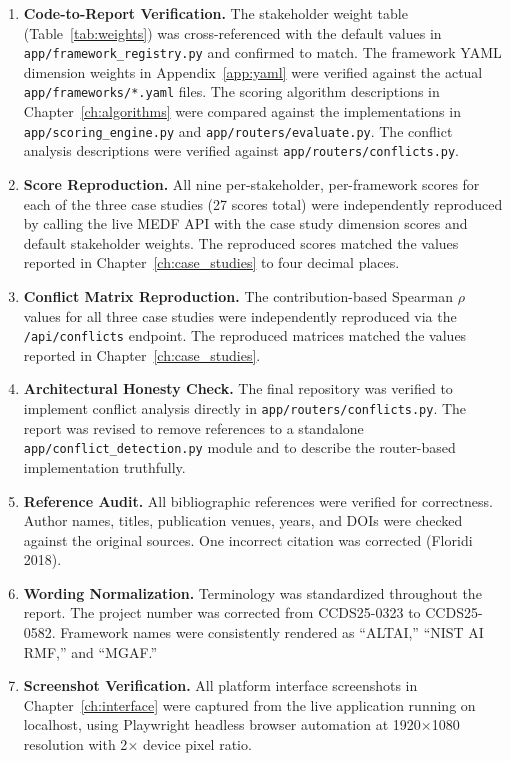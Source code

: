 \begin{enumerate}[leftmargin=2em]
  \item \textbf{Code-to-Report Verification.} The stakeholder weight table (Table~\ref{tab:weights}) was cross-referenced with the default values in \texttt{app/framework\_registry.py} and confirmed to match. The framework YAML dimension weights in Appendix~\ref{app:yaml} were verified against the actual \texttt{app/frameworks/*.yaml} files. The scoring algorithm descriptions in Chapter~\ref{ch:algorithms} were compared against the implementations in \texttt{app/scoring\_engine.py} and \texttt{app/routers/evaluate.py}. The conflict analysis descriptions were verified against \texttt{app/routers/conflicts.py}.

  \item \textbf{Score Reproduction.} All nine per-stakeholder, per-framework scores for each of the three case studies (27 scores total) were independently reproduced by calling the live MEDF API with the case study dimension scores and default stakeholder weights. The reproduced scores matched the values reported in Chapter~\ref{ch:case_studies} to four decimal places.

  \item \textbf{Conflict Matrix Reproduction.} The contribution-based Spearman $\rho$ values for all three case studies were independently reproduced via the \texttt{/api/conflicts} endpoint. The reproduced matrices matched the values reported in Chapter~\ref{ch:case_studies}.

  \item \textbf{Architectural Honesty Check.} The final repository was verified to implement conflict analysis directly in \texttt{app/routers/conflicts.py}. The report was revised to remove references to a standalone \texttt{app/conflict\_detection.py} module and to describe the router-based implementation truthfully.

  \item \textbf{Reference Audit.} All bibliographic references were verified for correctness. Author names, titles, publication venues, years, and DOIs were checked against the original sources. One incorrect citation was corrected (Floridi 2018).

  \item \textbf{Wording Normalization.} Terminology was standardized throughout the report. The project number was corrected from CCDS25-0323 to CCDS25-0582. Framework names were consistently rendered as \enquote{ALTAI,} \enquote{NIST AI RMF,} and \enquote{MGAF.}

  \item \textbf{Screenshot Verification.} All platform interface screenshots in Chapter~\ref{ch:interface} were captured from the live application running on localhost, using Playwright headless browser automation at 1920$\times$1080 resolution with 2$\times$ device pixel ratio.
\end{enumerate}

